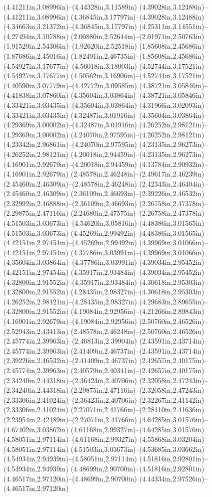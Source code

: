 (4.41211in,3.08996in)--(4.44328in,3.11589in) (4.39028in,3.12488in)--(4.41211in,3.08996in) (4.36845in,3.17797in)--(4.39028in,3.12488in) (4.34663in,3.21372in)--(4.36845in,3.17797in) (4.25311in,3.14551in)--(4.27494in,3.10788in) (2.00880in,2.52644in)--(2.01971in,2.50763in) (1.91529in,2.54306in)--(1.92620in,2.52518in) (1.85608in,2.45686in)--(1.87686in,2.45016in) (1.82491in,2.46735in)--(1.85608in,2.45686in) (4.54927in,3.17677in)--(4.56018in,3.18003in) (4.52744in,3.17521in)--(4.54927in,3.17677in) (4.50562in,3.16906in)--(4.52744in,3.17521in) (4.40590in,3.07779in)--(4.42772in,3.09585in) (4.38721in,3.05846in)--(4.41838in,3.07860in) (4.35604in,3.03864in)--(4.38721in,3.05846in) (4.33421in,3.03435in)--(4.35604in,3.03864in) (4.31966in,3.02093in)--(4.33421in,3.03435in) (4.32487in,3.01916in)--(4.35604in,3.03864in) (4.29369in,3.00002in)--(4.32487in,3.01916in) (4.26252in,2.98121in)--(4.29369in,3.00002in) (4.24070in,2.97595in)--(4.26252in,2.98121in) (4.23342in,2.96861in)--(4.24070in,2.97595in) (4.23135in,2.96273in)--(4.26252in,2.98121in) (4.20018in,2.94459in)--(4.23135in,2.96273in) (4.16901in,2.92679in)--(4.20018in,2.94459in) (4.13784in,2.90932in)--(4.16901in,2.92679in) (2.48578in,2.46248in)--(2.49617in,2.46239in) (2.45460in,2.46309in)--(2.48578in,2.46248in) (2.42343in,2.46404in)--(2.45460in,2.46309in) (2.36109in,2.46693in)--(2.39226in,2.46532in) (2.32992in,2.46888in)--(2.36109in,2.46693in) (2.26758in,2.47378in)--(2.29875in,2.47116in) (2.24680in,2.47575in)--(2.26758in,2.47378in) (4.51503in,3.03673in)--(4.54620in,3.05816in) (4.48386in,3.01565in)--(4.51503in,3.03673in) (4.45269in,2.99492in)--(4.48386in,3.01565in) (4.42151in,2.97454in)--(4.45269in,2.99492in) (4.39969in,3.01066in)--(4.42151in,2.97454in) (4.37786in,3.03991in)--(4.39969in,3.01066in) (4.35604in,3.03864in)--(4.37786in,3.03991in) (4.39034in,2.95452in)--(4.42151in,2.97454in) (4.35917in,2.93484in)--(4.39034in,2.95452in) (4.32800in,2.91552in)--(4.35917in,2.93484in) (4.30618in,2.95303in)--(4.32800in,2.91552in) (4.28435in,2.98327in)--(4.30618in,2.95303in) (4.26252in,2.98121in)--(4.28435in,2.98327in) (4.29683in,2.89655in)--(4.32800in,2.91552in) (4.19084in,2.92956in)--(4.21266in,2.89843in) (4.16901in,2.92679in)--(4.19084in,2.92956in) (2.50760in,2.46526in)--(2.52943in,2.43413in) (2.48578in,2.46248in)--(2.50760in,2.46526in) (2.45774in,2.39963in)--(2.46813in,2.39904in) (2.43591in,2.43714in)--(2.45774in,2.39963in) (2.41409in,2.46737in)--(2.43591in,2.43714in) (2.39226in,2.46532in)--(2.41409in,2.46737in) (2.42657in,2.40175in)--(2.45774in,2.39963in) (2.40579in,2.40341in)--(2.42657in,2.40175in) (2.34240in,2.44318in)--(2.36423in,2.40706in) (2.32058in,2.47243in)--(2.34240in,2.44318in) (2.29875in,2.47116in)--(2.32058in,2.47243in) (2.33306in,2.41024in)--(2.36423in,2.40706in) (2.32267in,2.41142in)--(2.33306in,2.41024in) (2.27071in,2.41766in)--(2.28110in,2.41636in) (2.23954in,2.42189in)--(2.27071in,2.41766in) (4.64285in,3.01576in)--(4.67402in,3.03862in) (4.61168in,2.99327in)--(4.64285in,3.01576in) (4.58051in,2.97114in)--(4.61168in,2.99327in) (4.55868in,3.03204in)--(4.58051in,2.97114in) (4.51503in,3.03673in)--(4.53685in,3.03662in) (4.54934in,2.94939in)--(4.58051in,2.97114in) (4.51816in,2.92801in)--(4.54934in,2.94939in) (4.48699in,2.90700in)--(4.51816in,2.92801in) (4.46517in,2.97120in)--(4.48699in,2.90700in) (4.44334in,2.97526in)--(4.46517in,2.97120in) 